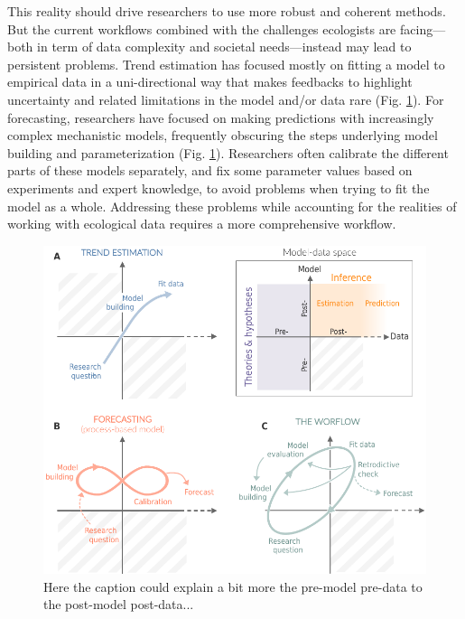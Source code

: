 \documentclass[11pt]{article}
\begin{document}
This reality should drive researchers to use more robust and coherent methods. But the current workflows combined with the challenges ecologists are facing---both in term of data complexity and societal needs---instead may lead to persistent problems. %
Trend estimation has focused mostly on fitting a model to empirical data in a uni-directional way %
that makes feedbacks to highlight uncertainty and related limitations in the model and/or data rare (Fig. \ref{fig:modeldata}). For forecasting, researchers have focused on making predictions with increasingly complex mechanistic models, frequently obscuring the steps underlying model building and parameterization (Fig. \ref{fig:modeldata}). Researchers often calibrate the different parts of these models separately, and fix some parameter values based on experiments and expert knowledge, to avoid problems when trying to fit the model as a whole. %
Addressing these problems while accounting for the realities of working with ecological data requires a more comprehensive workflow. 

\begin{figure}[h]
	\centering
	\includegraphics{figures/modeldataspaces}
	\caption{Here the caption could explain a bit more the pre-model pre-data to the post-model post-data...} 
	\label{fig:modeldata}
\end{figure}
\end{document}
